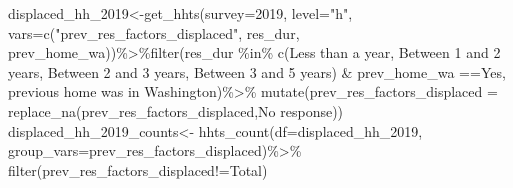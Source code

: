 \documentclass[
]{article}
\newenvironment{Shaded}{\begin{snugshade}}{\end{snugshade}}
\newcommand{\AttributeTok}[1]{\textcolor[rgb]{0.77,0.63,0.00}{#1}}
\newcommand{\FunctionTok}[1]{\textcolor[rgb]{0.00,0.00,0.00}{#1}}
\newcommand{\NormalTok}[1]{#1}
\newcommand{\OtherTok}[1]{\textcolor[rgb]{0.56,0.35,0.01}{#1}}
\newcommand{\SpecialCharTok}[1]{\textcolor[rgb]{0.00,0.00,0.00}{#1}}
\newcommand{\StringTok}[1]{\textcolor[rgb]{0.31,0.60,0.02}{#1}}
\begin{document}
\begin{Shaded}
\begin{Highlighting}[]
\NormalTok{displaced\_hh\_2019}\OtherTok{\textless{}{-}}\FunctionTok{get\_hhts}\NormalTok{(}\AttributeTok{survey=}\StringTok{\textquotesingle{}2019\textquotesingle{}}\NormalTok{, }\AttributeTok{level=}\StringTok{"h"}\NormalTok{, }\AttributeTok{vars=}\FunctionTok{c}\NormalTok{(}\StringTok{"prev\_res\_factors\_displaced"}\NormalTok{, }\StringTok{\textquotesingle{}res\_dur\textquotesingle{}}\NormalTok{, }\StringTok{\textquotesingle{}prev\_home\_wa\textquotesingle{}}\NormalTok{))}\SpecialCharTok{\%\textgreater{}\%}\FunctionTok{filter}\NormalTok{(res\_dur }\SpecialCharTok{\%in\%} \FunctionTok{c}\NormalTok{(}\StringTok{\textquotesingle{}Less than a year\textquotesingle{}}\NormalTok{, }\StringTok{\textquotesingle{}    Between 1 and 2 years\textquotesingle{}}\NormalTok{, }\StringTok{\textquotesingle{}Between 2 and 3 years\textquotesingle{}}\NormalTok{,    }\StringTok{\textquotesingle{}Between 3 and 5 years\textquotesingle{}}\NormalTok{) }\SpecialCharTok{\&}\NormalTok{ prev\_home\_wa }\SpecialCharTok{==}\StringTok{\textquotesingle{}Yes, previous home was in Washington\textquotesingle{}}\NormalTok{)}\SpecialCharTok{\%\textgreater{}\%} \FunctionTok{mutate}\NormalTok{(}\AttributeTok{prev\_res\_factors\_displaced =} \FunctionTok{replace\_na}\NormalTok{(prev\_res\_factors\_displaced,}\StringTok{\textquotesingle{}No response\textquotesingle{}}\NormalTok{))}
\NormalTok{displaced\_hh\_2019\_counts}\OtherTok{\textless{}{-}} \FunctionTok{hhts\_count}\NormalTok{(}\AttributeTok{df=}\NormalTok{displaced\_hh\_2019, }\AttributeTok{group\_vars=}\StringTok{\textquotesingle{}prev\_res\_factors\_displaced\textquotesingle{}}\NormalTok{)}\SpecialCharTok{\%\textgreater{}\%}
\FunctionTok{filter}\NormalTok{(prev\_res\_factors\_displaced}\SpecialCharTok{!=}\StringTok{\textquotesingle{}Total\textquotesingle{}}\NormalTok{)}


\end{Highlighting}
\end{Shaded}
\end{document}
